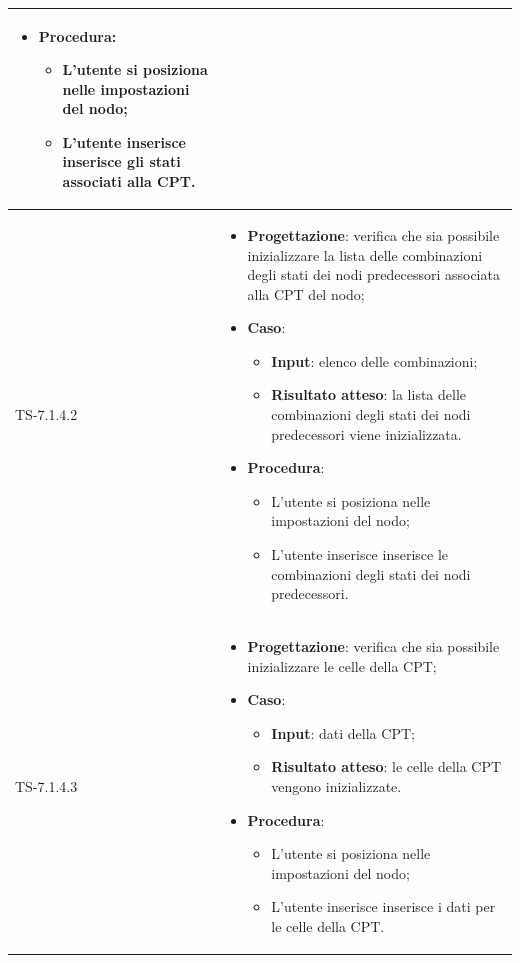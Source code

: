 \begin{longtable}{|C{2.5cm}|C{13cm}|}
\begin{itemize}
\begin{itemize}
	\end{itemize}
	\item \textbf{Procedura}:
	\begin{itemize}
		\item L'utente si posiziona nelle impostazioni del nodo;
		\item L'utente inserisce inserisce gli stati associati alla CPT.
	\end{itemize} 
\end{itemize}
	  \\
	\hline
	{TS-7.1.4.2} &
\begin{itemize}
	\item \textbf{Progettazione}: verifica che sia possibile inizializzare la lista delle combinazioni degli stati dei nodi predecessori associata alla CPT del nodo;
	\item \textbf{Caso}: 
	\begin{itemize}
		\item \textbf{Input}: elenco delle combinazioni;
		\item \textbf{Risultato atteso}: la lista delle combinazioni degli stati dei nodi predecessori viene inizializzata.
	\end{itemize}
	\item \textbf{Procedura}:
	\begin{itemize}
		\item L'utente si posiziona nelle impostazioni del nodo;
		\item L'utente inserisce inserisce le combinazioni degli stati dei nodi predecessori.
	\end{itemize} 
\end{itemize}
	 \\
	\hline
	{TS-7.1.4.3} &
\begin{itemize}
	\item \textbf{Progettazione}:  verifica che sia possibile inizializzare le celle della CPT;
	\item \textbf{Caso}: 
	\begin{itemize}
		\item \textbf{Input}: dati della CPT;
		\item \textbf{Risultato atteso}: le celle della CPT vengono inizializzate.
	\end{itemize}
	\item \textbf{Procedura}:
	\begin{itemize}
		\item L'utente si posiziona nelle impostazioni del nodo;
		\item L'utente inserisce inserisce i dati per le celle della CPT.

\end{itemize}
\end{itemize}
\end{longtable}
